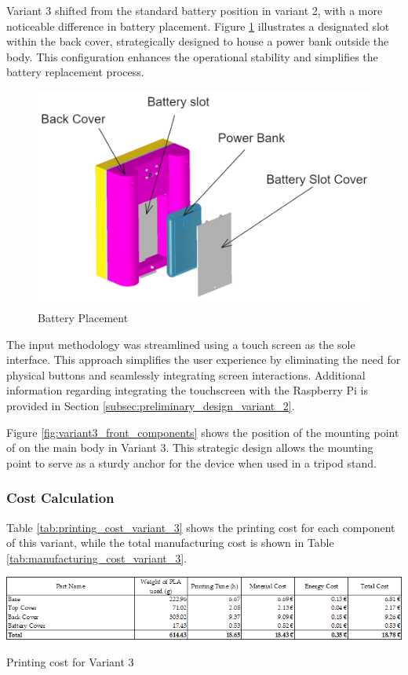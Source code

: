 Variant 3 shifted from the standard battery position in variant 2, with a more noticeable difference in battery placement. Figure \ref{fig:variant3_battery_placement} illustrates a designated slot within the back cover, strategically designed to house a power bank outside the body. This configuration enhances the operational stability and simplifies the battery replacement process.

\begin{figure}[!ht]
    \centering
    \includegraphics[width=0.5\linewidth]{texs/Part1/chapter4/image/v35.png}
    \caption{Battery Placement}
    \label{fig:variant3_battery_placement}
\end{figure}

The input methodology was streamlined using a touch screen as the sole interface. This approach simplifies the user experience by eliminating the need for physical buttons and seamlessly integrating screen interactions. Additional information regarding integrating the touchscreen with the Raspberry Pi is provided in Section \ref{subsec:preliminary_design_variant_2}.

Figure \ref{fig:variant3_front_components} shows the position of the mounting point of on the main body in Variant 3. This strategic design allows the mounting point to serve as a sturdy anchor for the device when used in a tripod stand.


\subsubsection{Cost Calculation}
Table \ref{tab:printing_cost_variant_3} shows the printing cost for each component of this variant, while the total manufacturing cost is shown in Table \ref{tab:manufacturing_cost_variant_3}.

\begin{table}[H]
    \centering
    \includegraphics[width=\linewidth]{texs/Part1/chapter3/image/v3printed.png}
    \caption{Printing cost for Variant 3}
    \label{tab:printing_cost_variant_3}
\end{table}

